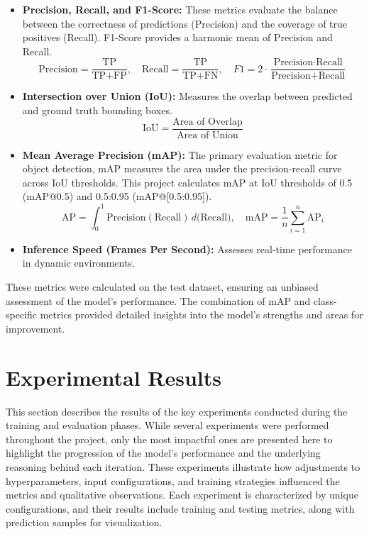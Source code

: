 \documentclass[11pt]{article}
\begin{document}
\begin{itemize} 
    \item \textbf{Precision, Recall, and F1-Score:} These metrics evaluate the balance between the correctness of predictions (Precision) and the coverage of true positives (Recall). F1-Score provides a harmonic mean of Precision and Recall.
    \[
    \text{Precision} = \frac{\text{TP}}{\text{TP} + \text{FP}}, \quad
    \text{Recall} = \frac{\text{TP}}{\text{TP} + \text{FN}}, \quad
    F1 = 2 \cdot \frac{\text{Precision} \cdot \text{Recall}}{\text{Precision} + \text{Recall}}
    \]

    \item \textbf{Intersection over Union (IoU):} Measures the overlap between predicted and ground truth bounding boxes.
    \[
    \text{IoU} = \frac{\text{Area of Overlap}}{\text{Area of Union}}
    \]

    \item \textbf{Mean Average Precision (mAP):} The primary evaluation metric for object detection, mAP measures the area under the precision-recall curve across IoU thresholds. This project calculates mAP at IoU thresholds of 0.5 (mAP@0.5) and 0.5:0.95 (mAP@[0.5:0.95]).
    \[
    \text{AP} = \int_0^1 \text{Precision}(\text{Recall}) \, d(\text{Recall)}, \quad
    \text{mAP} = \frac{1}{n} \sum_{i=1}^{n} \text{AP}_i
    \]

    \item \textbf{Inference Speed (Frames Per Second):} Assesses real-time performance in dynamic environments.
\end{itemize}

These metrics were calculated on the test dataset, ensuring an unbiased assessment of the model’s performance. The combination of mAP and class-specific metrics provided detailed insights into the model’s strengths and areas for improvement.


\section{Experimental Results}
This section describes the results of the key experiments conducted during the training and evaluation phases. While several experiments were performed throughout the project, only the most impactful ones are presented here to highlight the progression of the model's performance and the underlying reasoning behind each iteration. These experiments illustrate how adjustments to hyperparameters, input configurations, and training strategies influenced the metrics and qualitative observations. Each experiment is characterized by unique configurations, and their results include training and testing metrics, along with prediction samples for visualization.
\end{document}
